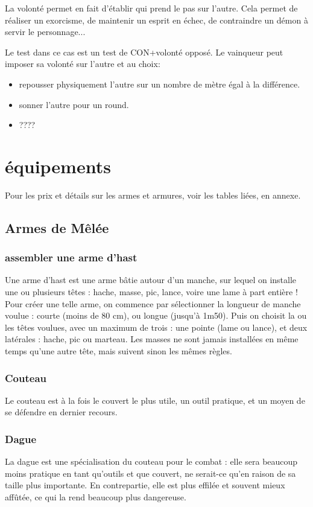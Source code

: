 \documentclass[10pt,a4paper,twocolumn]{book}
\begin{document}
La volonté permet en fait d'établir  qui prend le pas sur l'autre. Cela permet de réaliser un exorcisme, de maintenir un esprit en échec, de contraindre un démon à servir le personnage...

Le test dans ce cas est un test de CON+volonté opposé. Le vainqueur peut imposer sa volonté sur l'autre et au choix:
\begin{itemize}
\item repousser physiquement l'autre sur un nombre de mètre égal à la différence.
\item sonner l'autre pour un round.
\item ????
\end{itemize}
\section{équipements}
Pour les prix et détails sur les armes et armures, voir les tables liées, en annexe.
\subsection{Armes de Mêlée}
\subsubsection{assembler une arme d’hast}
Une arme d’hast est une arme bâtie autour d’un manche, sur lequel on installe une ou plusieurs têtes : hache, masse, pic, lance, voire une lame à part entière ! Pour créer une telle arme, on commence par sélectionner la longueur de manche voulue : courte (moins de 80 cm), ou longue (jusqu’à 1m50). Puis on choisit la ou les têtes voulues, avec un maximum de trois : une pointe (lame ou lance), et deux latérales : hache, pic ou marteau. Les masses ne sont jamais installées en même temps qu’une autre tête, mais suivent sinon les mêmes règles.
\subsubsection{Couteau}
Le couteau est à la fois le couvert le plus utile, un outil pratique, et un moyen de se défendre en dernier recours.
\subsubsection{Dague}
La dague est une spécialisation du couteau pour le combat : elle sera beaucoup moins pratique en tant qu’outils et que couvert, ne serait-ce qu’en raison de sa taille plus importante. En contrepartie, elle est plus effilée et souvent mieux affûtée, ce qui la rend beaucoup plus dangereuse.
\end{document}
